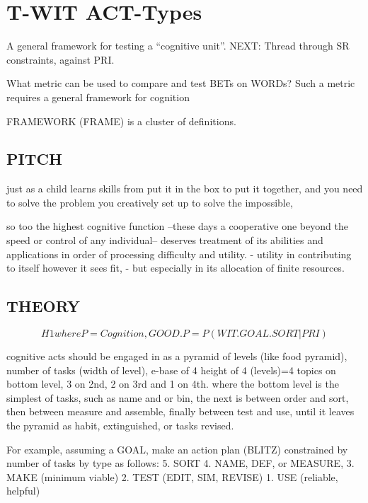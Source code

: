 \documentclass[
]{book}
\begin{document}
\hypertarget{t-wit-act-types}{%
\section{T-WIT ACT-Types}\label{t-wit-act-types}}

A general framework for testing a ``cognitive unit''.
NEXT: Thread through SR constraints, against PRI.

What metric can be used to compare and test BETs on WORDs?
Such a metric requires a general framework for cognition

FRAMEWORK (FRAME) is a cluster of definitions.

\hypertarget{pitch-2}{%
\subsection{PITCH}\label{pitch-2}}

just as a child learns skills
from put it in the box
to put it together,
and you need to solve
the problem you creatively set up
to solve the impossible,

so too
the highest cognitive function
--these days a cooperative one
beyond the speed or control
of any individual--
deserves treatment
of its abilities and applications
in order of processing difficulty
and utility.
- utility in contributing to itself however it sees fit,
- but especially in its allocation of finite resources.

\hypertarget{theory}{%
\subsection{THEORY}\label{theory}}

\[ H1  
where P = Cognition,
GOOD.P = P(WIT.GOAL.SORT|PRI) \]

cognitive acts should be engaged in as a pyramid of levels (like food pyramid),
number of tasks (width of level),
e-base of 4 height of 4 (levels)=4 topics on bottom level, 3 on 2nd, 2 on 3rd and 1 on 4th.
where the bottom level is the simplest of tasks, such as
name and or bin,
the next is between order and sort,
then between measure and assemble,
finally between test and use,
until it leaves the pyramid as habit, extinguished, or tasks revised.

For example, assuming a GOAL, make an action plan (BLITZ) constrained by number of tasks by type as follows:
5. SORT
4. NAME, DEF, or MEASURE,
3. MAKE (minimum viable)
2. TEST (EDIT, SIM, REVISE)
1. USE (reliable, helpful)
\end{document}
